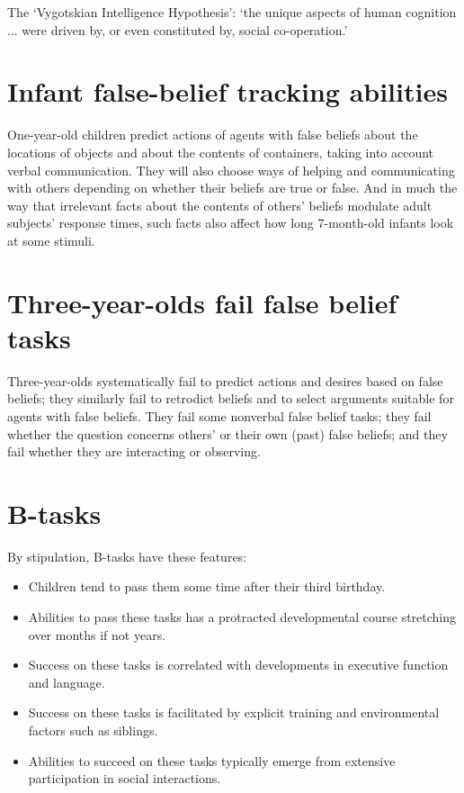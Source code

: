 \documentclass[11pt]{extarticle}
\begin{document}
\begin{multicols}{3}
The `Vygotskian Intelligence Hypothesis': `the unique aspects of human cognition ... were driven by, or even constituted by, social co-operation.'\citep%
{Moll:2007gu}



\section{Infant false-belief tracking abilities}
One-year-old children predict actions of agents with false beliefs about the locations of objects\citep{Clements:1994cw,Onishi:2005hm,Southgate:2007js} and about the contents of containers,\citep{he:2011_false} 
taking into account verbal communication.\citep{Song:2008qo,scott:2012_verbal_fb}
They will also choose ways of helping\citep[]{Buttelmann:2009gy} and communicating\citep{Knudsen:2011fk,southgate:2010fb} with others depending on whether their beliefs are true or false.  
And in much the way that irrelevant facts about the contents of others’ beliefs modulate adult subjects’ response times, such facts also affect how long 7-month-old infants look at some stimuli.\citep[]{kovacs_social_2010}


\section{Three-year-olds fail false belief tasks}
Three-year-olds systematically fail to predict actions\citep{Wimmer:1983dz} and desires\citep{Astington:1991kk} based on false beliefs; they similarly fail to retrodict beliefs\citep{Wimmer:1998kx} and to select arguments suitable for agents with false beliefs.\citep{Bartsch:2000es}
They fail some nonverbal false belief tasks;\citealp{Call:1999co,low:2010_preschoolers}
they fail whether the question concerns others' or their own (past) false beliefs;\citep{Gopnik:1991db}
and they fail whether they are interacting or observing.\citep{Chandler:1989qa}

\section{B-tasks}
By stipulation, B-tasks have these features:
\begin{itemize}
\item Children tend to pass them some time after their third birthday.
\item Abilities to pass these tasks has a protracted developmental course stretching over months if not years.
\item Success on these tasks is correlated with developments in executive function\citep[]{Perner:1999yr, Sabbagh:2006ke} and language.\citep[]{Astington2005ot}
\item Success on these tasks is facilitated by explicit training\citep[]{Slaughter:1996fv} and environmental factors such as siblings.\citep[]{Clements:2000nc, Hughes:2004zj}
\item Abilities to succeed on these tasks typically emerge from extensive participation in social interactions.\citealp{Hughes:2006fu}
\end{itemize}



\end{multicols}
\end{document}
